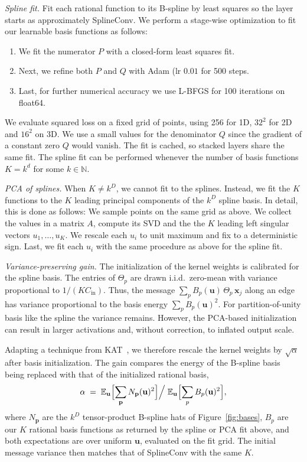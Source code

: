 \documentclass{article} %
\newcommand{\bx}{\mathbf{x}}
\newcommand{\bu}{\mathbf{u}}
\newcommand{\N}{\mathbb{N}}
\newcommand{\E}{\mathbb{E}}
\newcommand{\Cin}{C_{\mathrm{in}}}
\begin{document}
\emph{Spline fit.}
Fit each rational function to its B-spline by least squares so the layer starts as approximately SplineConv.
We perform a stage-wise optimization to fit our learnable basis functions as follows:
\begin{enumerate}
    \item We fit the numerator $P$ with a closed-form least squares fit.
    \item Next, we refine both $P$ and $Q$ with Adam (lr $0.01$ for 500 steps.
    \item Last, for further numerical accuracy we use L-BFGS for 100 iterations on float64.
\end{enumerate}
We evaluate squared loss on a fixed grid of points, using 256 for 1D, $32^2$ for 2D and $16^2$ on 3D.
We use a small values for the denominator $Q$ since the gradient of a constant zero $Q$ would vanish.
The fit is cached, so stacked layers share the same fit.
The spline fit can be performed whenever the number of basis functions $K = k^d$ for some $k \in \N$.

\emph{PCA of splines.}
When $K \ne k^D$, we cannot fit to the splines.
Instead, we fit the $K$ functions to the $K$ leading principal components of the $k^D$ spline basis.
In detail, this is done as follows:
We sample points on the same grid as above.
We collect the values in a matrix $A$, compute its SVD and the the $K$ leading left singular vectors $u_1,\ldots,u_K$.
We rescale each $u_i$ to unit maximum and fix to a deterministic sign.
Last, we fit each $u_i$ with the same procedure as above for the spline fit.

\emph{Variance-preserving gain.}
The initialization of the kernel weights is calibrated for the spline basis.
The entries of $\Theta_p$ are drawn i.i.d.\ zero-mean with variance proportional to $1/(K\Cin)$.
Thus, the message $\sum_p B_p(\bu)\,\Theta_p\,\bx_j$ along an edge has variance proportional to the basis energy $\sum_p B_p(\bu)^2$.
For partition-of-unity basis like the spline the variance remains.
However, the PCA-based initialization can result in larger activations and, without correction, to inflated output scale.

Adapting a technique from KAT~\citep{yang2025kat}, we therefore rescale the
kernel weights by $\sqrt{\alpha}$ after basis initialization.
The gain compares the energy of the B-spline basis being replaced with that
of the initialized rational basis,
\begin{equation}
\alpha \;=\;
\E_{\bu}\Bigl[\sum_{\mathbf p} N_{\mathbf p}(\bu)^2\Bigr] \Big/\;
\E_{\bu}\Bigl[\sum_p B_p(\bu)^2\Bigr],
\label{eq:vp}
\end{equation}
where $N_{\mathbf p}$ are the $k^D$ tensor-product B-spline hats of
Figure~\ref{fig:bases}, $B_p$ are our $K$ rational basis functions as
returned by the spline or PCA fit above, and both expectations are over
uniform $\bu$, evaluated on the fit grid.
The initial message variance then matches that of SplineConv with the same
$K$.
\end{document}
